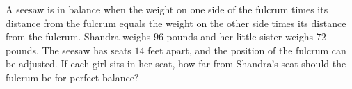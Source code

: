 A seesaw is in balance when the weight on one side of the fulcrum times its distance from the fulcrum equals the weight on the other side times its distance from the fulcrum. Shandra weighs $96$ pounds and her little sister weighs $72$ pounds. The seesaw has seats $14$ feet apart, and the position of the fulcrum can be adjusted. If each girl sits in her seat, how far from Shandra's seat should the fulcrum be for perfect balance?
